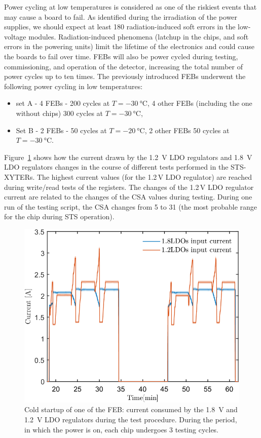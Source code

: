 Power cycling at low temperatures is considered as one of the riskiest events that may cause a board to fail.  As identified during the irradiation of the power supplies, we should expect at least 180 radiation-induced soft errors in the low-voltage modules. Radiation-induced phenomena (latchup in the chips, and soft errors in the powering units) limit the lifetime of the electronics and could cause the boards to fail over time. \glspl{FEB} will also be power cycled during testing, commissioning, and operation of the detector, increasing the total number of power cycles up to ten times. The previously introduced \glspl{FEB} underwent the following power cycling in low temperatures:
\begin{itemize}
    \item set A - 4 \glspl{FEB} - 200 cycles at $T = \SI{-30}{\celsius}$, 4 other \glspl{FEB} (including the one without chips) 300 cycles at $T = \SI{-30}{\celsius}$,
    \item Set B - 2 \glspl{FEB} - 50 cycles at $T = \SI{-20}{\celsius}$, 2 other \glspl{FEB} 50 cycles at $T = \SI{-30}{\celsius}$.
\end{itemize}
Figure~\ref{fig_power_cycle} shows how the current drawn by the 1.2~V \gls{LDO} regulators and 1.8~V \gls{LDO} regulators changes in the course of different tests performed in the STS-XYTERs. The highest current values (for the 1.2\,V LDO regulator) are reached during write/read tests of the registers. The changes of the 1.2\,V LDO regulator current are related to the changes of the \gls{CSA} values during testing. During one run of the testing script, the \gls{CSA} changes from 5 to 31 (the most probable range for the chip during STS operation). 
\begin{figure}[!h]
\centering
\includegraphics[width=0.6\columnwidth]{Chapter4/images/currents.png}
\caption{Cold startup of one of the \gls{FEB}: current consumed by the 1.8~V and 1.2~V \gls{LDO} regulators during the test procedure. During the period, in which the power is on, each chip undergoes 3 testing cycles.}
\label{fig_power_cycle}
\end{figure}

